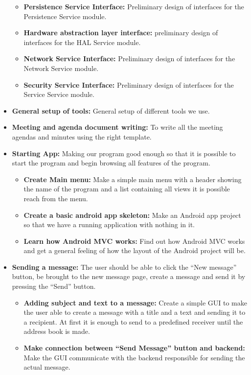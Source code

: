 \begin{itemize}
\begin{itemize}
\item{}\textbf{Persistence Service Interface:} Preliminary design of interfaces for the Persistence Service module.
\item{}\textbf{Hardware abstraction layer interface:} preliminary design of interfaces for the HAL Service module.
\item{}\textbf{Network Service Interface:} Preliminary design of interfaces for the Network Service module.
\item{}\textbf{Security Service Interface:} Preliminary design of interfaces for the Service Service module.
\end{itemize}
\item{}\textbf{General setup of tools:} General setup of different tools we use.
\item{}\textbf{Meeting and agenda document writing:} To write all the meeting agendas and minutes using the right template.
\item{}\textbf{Starting App:} Making our program good enough so that it is possible to start the program and begin browsing all features of the program.
\begin{itemize}
\item{}\textbf{Create Main menu:} Make a simple main menu with a header showing the name of the program and a list containing all views it is possible reach from the menu.
\item{}\textbf{Create a basic android app skeleton:} Make an Android app project so that we have a running application with nothing in it.
\item{}\textbf{Learn how Android MVC works:} Find out how Android MVC works and get a general feeling of how the layout of the Android project will be.
\end{itemize}
\item{}\textbf{Sending a message:} The user should be able to click the “New message” button, be brought to the new message page, create a message and send it by pressing the “Send” button.
\begin{itemize}
\item{}\textbf{Adding subject and text to a message:} Create a simple GUI to make the user able to create a message with a title and a text and sending it to a recipient. At first it is enough to send to a predefined receiver until the address book is made.
\item{}\textbf{Make connection between “Send Message” button and backend:} Make the GUI communicate with the backend responsible for sending the actual message.

\end{itemize}
\end{itemize}

